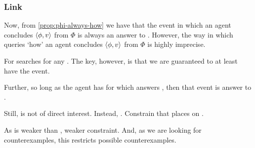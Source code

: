 





\subsubsection{Link}
\label{cha:var:sec:vars:qhowv:sec:link}

\begin{note}
    Now, from \autoref{prop:phi-always-how} we have that the event in which an agent concludes \(\langle \phi, v \rangle\) from \(\Phi\) is always an answer to \qHowV{}.
  However, the way in which \qHowV{} queries `how' an agent concludes \(\langle \phi, v \rangle\) from \(\Phi\) is highly imprecise.

  For \qHowV{} searches for any \wit{}.
  The key, however, is that we are guaranteed to at least have the event.

  Further, so long as the agent has \wit{} for \ros{} which answers \qWhyV{}, then that event is answer to \qHowV{}.

  Still, \qHow{} is not of direct interest.
  Instead, \issueInclusion{}.
  Constrain that \qHow{} places on \qWhy{}.

  As \qHowV{} is weaker than \qHow{}, weaker constraint.
  And, as we are looking for counterexamples, this restricts possible counterexamples.
\end{note}

